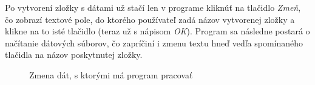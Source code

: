 Po vytvorení zložky s dátami už stačí len v programe kliknúť na tlačidlo \textit{Zmeň}, čo zobrazí textové pole, do ktorého používateľ zadá názov vytvorenej zložky a klikne na to isté tlačidlo (teraz už s nápisom \textit{OK}). Program sa následne postará o načítanie dátových súborov, čo zapríčiní i zmenu textu hneď vedľa spomínaného tlačidla na názov poskytnutej zložky.\newline

\begin{figure}[H]
  \caption{Zmena dát, s ktorými má program pracovať}
  \label{ukazka_programu3}
\end{figure}
